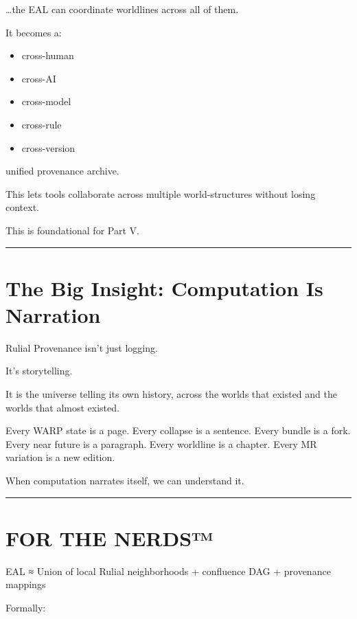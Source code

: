 \ldots the EAL can coordinate worldlines across all of them.

It becomes a:

\begin{itemize}
\tightlist
\item
  cross-human
\item
  cross-AI
\item
  cross-model
\item
  cross-rule
\item
  cross-version
\end{itemize}

unified provenance archive.

This lets tools collaborate across multiple world-structures without
losing context.

This is foundational for Part V.

\begin{center}\rule{0.5\linewidth}{0.5pt}\end{center}

\section{\texorpdfstring{\textbf{The Big Insight:
Computation Is
Narration}}{The Big Insight: Computation Is Narration}}\label{the-big-insight-computation-is-narration}

Rulial Provenance isn't just logging.

It's storytelling.

It is the universe telling its own history, across the worlds that
existed and the worlds that almost existed.

Every WARP state is a page. Every collapse is a sentence. Every bundle is
a fork. Every near future is a paragraph. Every worldline is a chapter.
Every MR variation is a new edition.

When computation narrates itself, we can understand it.

\begin{center}\rule{0.5\linewidth}{0.5pt}\end{center}

\section*{FOR THE NERDS™}

EAL ≈ Union of local Rulial neighborhoods + confluence DAG + provenance
mappings

Formally:

